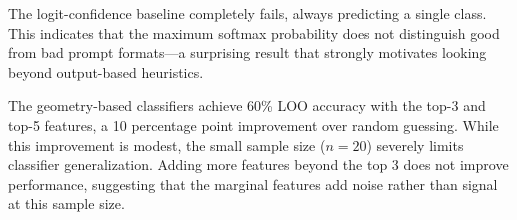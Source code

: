 The logit-confidence baseline completely fails, always predicting a single class.
This indicates that the maximum softmax probability does not distinguish good from bad prompt formats---a surprising result that strongly motivates looking beyond output-based heuristics.

The geometry-based classifiers achieve 60\% LOO accuracy with the top-3 and top-5 features, a 10 percentage point improvement over random guessing.
While this improvement is modest, the small sample size ($n = 20$) severely limits classifier generalization.
Adding more features beyond the top 3 does not improve performance, suggesting that the marginal features add noise rather than signal at this sample size.
